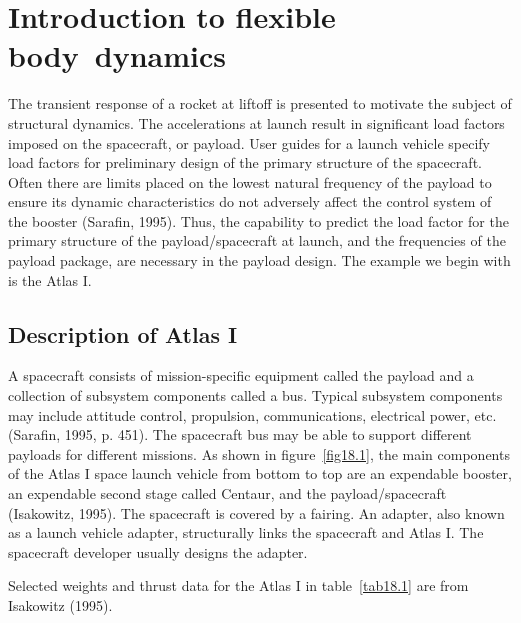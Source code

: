 \documentclass{AeroStructure-ERJohnson}
\begin{document}
\mainmatter


\setcounter{chapter}{17}
\setcounter{page}{485}

\chapter{Introduction to flexible body~dynamics}

The transient response of a rocket at liftoff is presented to motivate the subject of structural dynamics. The accelerations at launch result in significant load factors imposed on the spacecraft, or payload. User guides for a launch vehicle specify load factors for preliminary design of the primary structure of the spacecraft. Often there are limits placed on the lowest natural frequency of the payload to ensure its dynamic characteristics do not adversely affect the control system of the booster (Sarafin, 1995). Thus, the capability to predict the load factor for the primary structure of the payload/spacecraft at launch, and the frequencies of the payload package, are necessary in the payload design. The example we begin with is the Atlas I.

\section{Description of Atlas I}\label{sec18.1}

A spacecraft consists of mission-specific equipment called the payload and a collection of subsystem components called a bus. Typical subsystem components may include attitude control, propulsion, communications, electrical power, etc. (Sarafin, 1995, p. 451). The spacecraft bus may be able to support different payloads for different missions. As shown in figure~\ref{fig18.1}, the main components of the Atlas I space launch vehicle from bottom to top are an expendable booster, an expendable second stage called Centaur, and the payload/spacecraft (Isakowitz, 1995). The spacecraft is covered by a fairing. An adapter, also known as a launch vehicle adapter, structurally links the spacecraft and Atlas I. The spacecraft developer usually designs the adapter.

Selected weights and thrust data for the Atlas I in table~\ref{tab18.1} are from Isakowitz (1995).

\begin{table}[h]%
\end{table}
\end{document}
